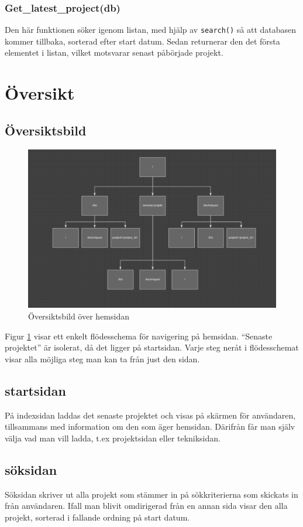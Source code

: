 \documentclass{TDP003mall}
\begin{document}
\subsubsection{Get\_latest\_project(db)}
Den här funktionen söker igenom listan, med hjälp av \texttt{search()} så att databasen kommer tillbaka, sorterad efter start datum. Sedan returnerar den det första elementet i listan, vilket motsvarar
senast påbörjade projekt.

\newpage
\section{Översikt}
\subsection{Översiktsbild}
\begin{figure}[H]
    \centering
    \includegraphics[width=\linewidth]{overview.PNG}
    \caption{Översiktsbild över hemsidan}
    \label{fig:overview}
\end{figure}
Figur \ref{fig:overview} visar ett enkelt flödesschema för navigering på hemsidan. ``Senaste projektet'' är isolerat, då det ligger på startsidan. Varje steg neråt i flödesschemat visar alla möjliga steg man kan ta från just den sidan.
\subsection{startsidan}
På indexsidan laddas det senaste projektet och visas på skärmen för användaren, tillsammans med information om den som äger hemsidan. Därifrån får man själv välja vad man vill ladda, t.ex projektsidan eller tekniksidan.
\subsection{söksidan}
Söksidan skriver ut alla projekt som stämmer in på sökkriterierna som skickats in från användaren. Ifall man blivit omdirigerad från en annan sida visar den alla projekt, sorterad i fallande ordning på start datum.
\end{document}
